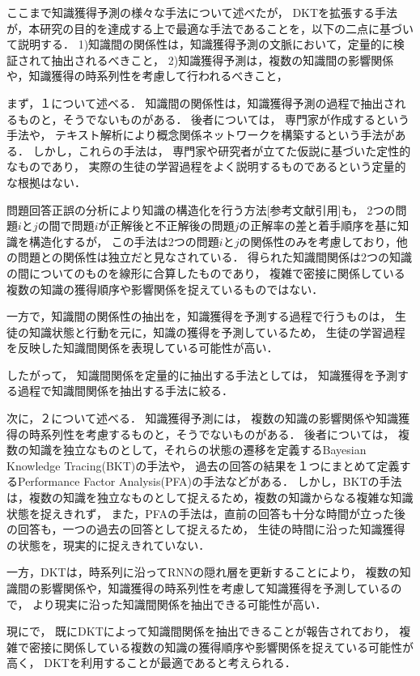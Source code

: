 ここまで知識獲得予測の様々な手法について述べたが，
DKTを拡張する手法が，本研究の目的を達成する上で最適な手法であることを，以下の二点に基づいて説明する．
1)知識間の関係性は，知識獲得予測の文脈において，定量的に検証されて抽出されるべきこと，
2)知識獲得予測は，複数の知識間の影響関係や，知識獲得の時系列性を考慮して行われるべきこと，


まず，１について述べる．
知識間の関係性は，知識獲得予測の過程で抽出されるものと，そうでないものがある．
後者については，
専門家が作成するという手法や，
テキスト解析により概念関係ネットワークを構築するという手法\cite{chen2008mining}がある．
しかし，これらの手法は，
専門家や研究者が立てた仮説に基づいた定性的なものであり，
実際の生徒の学習過程をよく説明するものであるという定量的な根拠はない．

問題回答正誤の分析により知識の構造化を行う方法[参考文献引用]も，%
2つの問題$i$と$j$の間で問題$i$が正解後と不正解後の問題$j$の正解率の差と着手順序を基に知識を構造化するが，
この手法は2つの問題$i$と$j$の関係性のみを考慮しており，他の問題との関係性は独立だと見なされている．
得られた知識間関係は2つの知識の間についてのものを線形に合算したものであり，
複雑で密接に関係している複数の知識の獲得順序や影響関係を捉えているものではない．

一方で，知識間の関係性の抽出を，知識獲得を予測する過程で行うものは，
生徒の知識状態と行動を元に，知識の獲得を予測しているため，
生徒の学習過程を反映した知識間関係を表現している可能性が高い．

したがって，
知識間関係を定量的に抽出する手法としては，
知識獲得を予測する過程で知識間関係を抽出する手法に絞る．


次に，２について述べる．
知識獲得予測には，
複数の知識の影響関係や知識獲得の時系列性を考慮するものと，そうでないものがある．
後者については，
複数の知識を独立なものとして，それらの状態の遷移を定義するBayesian Knowledge Tracing(BKT)の手法や，
過去の回答の結果を１つにまとめて定義するPerformance Factor Analysis(PFA)の手法などがある．
しかし，BKTの手法は，複数の知識を独立なものとして捉えるため，複数の知識からなる複雑な知識状態を捉えきれず，
また，PFAの手法は，直前の回答も十分な時間が立った後の回答も，一つの過去の回答として捉えるため，
生徒の時間に沿った知識獲得の状態を，現実的に捉えきれていない．

一方，DKTは，時系列に沿ってRNNの隠れ層を更新することにより，
複数の知識間の影響関係や，知識獲得の時系列性を考慮して知識獲得を予測しているので，
より現実に沿った知識間関係を抽出できる可能性が高い．

現に\cite{piech2015deep}で，
既にDKTによって知識間関係を抽出できることが報告されており，
複雑で密接に関係している複数の知識の獲得順序や影響関係を捉えている可能性が高く，
DKTを利用することが最適であると考えられる．

